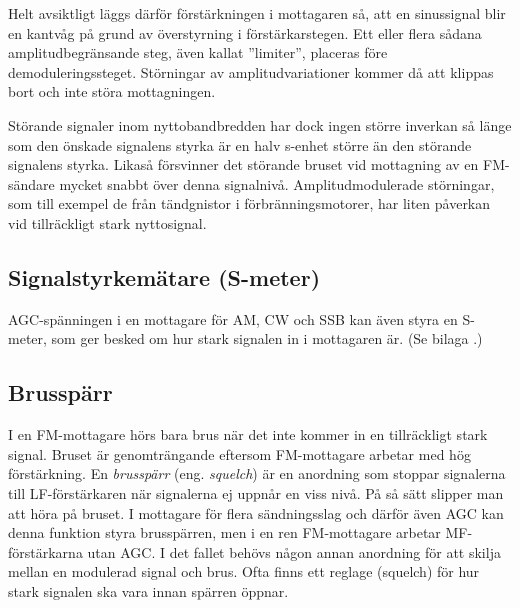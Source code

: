 
Helt avsiktligt läggs därför förstärkningen i mottagaren så, att en
sinussignal blir en kantvåg på grund av överstyrning i förstärkarstegen.
Ett eller flera sådana amplitudbegränsande steg, även kallat ''limiter'',
placeras före demoduleringssteget.
Störningar av amplitudvariationer kommer då att klippas bort och inte störa
mottagningen.

Störande signaler inom nyttobandbredden har dock ingen större inverkan
så länge som den önskade signalens styrka är en halv s-enhet större än
den störande signalens styrka.
Likaså försvinner det störande bruset vid mottagning av en FM-sändare mycket
snabbt över denna signalnivå.
Amplitudmodulerade störningar, som till exempel de från tändgnistor i
förbränningsmotorer, har liten påverkan vid tillräckligt stark nyttosignal.

\subsection{Signalstyrkemätare (S-meter)}

AGC-spänningen i en mottagare för AM, CW och SSB kan även styra en
S-meter, som ger besked om hur stark signalen in i mottagaren är.
(Se bilaga .)

\subsection{Brusspärr}
\label{brusspärr}

I en FM-mottagare hörs bara brus när det inte kommer in en tillräckligt stark
signal.
Bruset är genomträngande eftersom FM-mottagare arbetar med hög förstärkning.
En \emph{brusspärr} (eng. \emph{squelch}) är en anordning som stoppar
signalerna till LF-förstärkaren när signalerna ej uppnår en viss nivå.
På så sätt slipper man att höra på bruset.
I mottagare för flera sändningsslag och därför även AGC kan denna funktion
styra brusspärren, men i en ren FM-mottagare arbetar MF-förstärkarna utan AGC.
I det fallet behövs någon annan anordning för att skilja mellan en modulerad
signal och brus.
Ofta finns ett reglage (squelch) för hur stark signalen ska vara innan spärren
öppnar.

